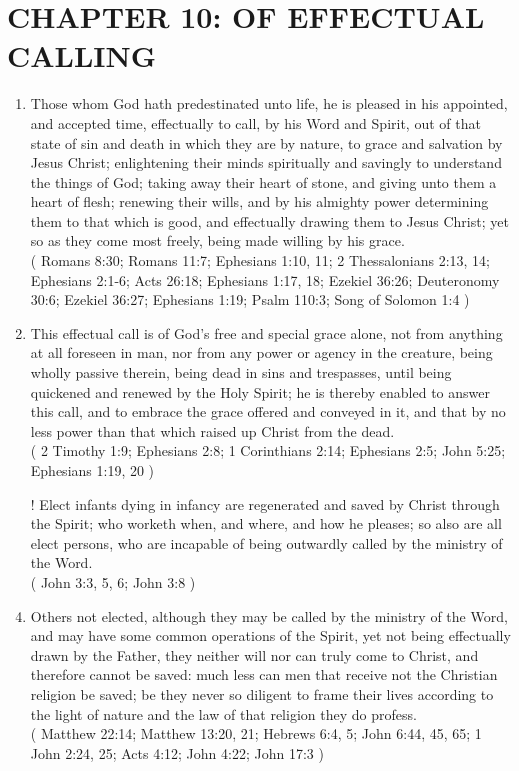 \documentclass[12pt,a4paper]{book}
\begin{document}
\chapter{CHAPTER 10: OF EFFECTUAL CALLING}
\label{ch-eff-cal}
\begin{enumerate}
\item Those whom God hath predestinated unto life, he is pleased in his appointed, and accepted time, effectually to call, by his Word and Spirit, out of that state of sin and death in which they are by nature, to grace and salvation by Jesus Christ; enlightening their minds spiritually and savingly to understand the things of God; taking away their heart of stone, and giving unto them a heart of flesh; renewing their wills, and by his almighty power determining them to that which is good, and effectually drawing them to Jesus Christ; yet so as they come most freely, being made willing by his grace.\\
( Romans 8:30; Romans 11:7; Ephesians 1:10, 11; 2 Thessalonians 2:13, 14; Ephesians 2:1-6; Acts 26:18; Ephesians 1:17, 18; Ezekiel 36:26; Deuteronomy 30:6; Ezekiel 36:27; Ephesians 1:19; Psalm 110:3; Song of Solomon 1:4 )
\item This effectual call is of God's free and special grace alone, not from anything at all foreseen in man, nor from any power or agency in the creature, being wholly passive therein, being dead in sins and trespasses, until being quickened and renewed by the Holy Spirit; he is thereby enabled to answer this call, and to embrace the grace offered and conveyed in it, and that by no less power than that which raised up Christ from the dead.\\
( 2 Timothy 1:9; Ephesians 2:8; 1 Corinthians 2:14; Ephesians 2:5; John 5:25; Ephesians 1:19, 20 )
\item [!] Elect infants dying in infancy are regenerated and saved by Christ through the Spirit; who worketh when, and where, and how he pleases; so also are all elect persons, who are incapable of being outwardly called by the ministry of the Word.\\
( John 3:3, 5, 6; John 3:8 )
\item Others not elected, although they may be called by the ministry of the Word, and may have some common operations of the Spirit, yet not being effectually drawn by the Father, they neither will nor can truly come to Christ, and therefore cannot be saved: much less can men that receive not the Christian religion be saved; be they never so diligent to frame their lives according to the light of nature and the law of that religion they do profess.\\
( Matthew 22:14; Matthew 13:20, 21; Hebrews 6:4, 5; John 6:44, 45, 65; 1 John 2:24, 25; Acts 4:12; John 4:22; John 17:3 )
\end{enumerate}
\end{document}
